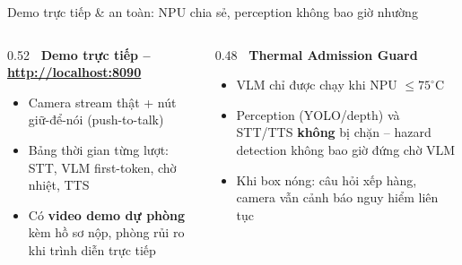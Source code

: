 \documentclass[aspectratio=169]{beamer}
\begin{document}
\begin{frame}{Demo trực tiếp \& an toàn: NPU chia sẻ, perception không bao giờ nhường}
  \begin{columns}[T]
    \begin{column}{0.52\textwidth}
      \textbf{\faPlayCircle\ Demo trực tiếp -- \url{http://localhost:8090}}
      \begin{itemize}
        \item Camera stream thật + nút giữ-để-nói (push-to-talk)
        \item Bảng thời gian từng lượt: STT, VLM first-token, chờ nhiệt, TTS
        \item Có \textbf{video demo dự phòng} kèm hồ sơ nộp, phòng rủi ro khi
              trình diễn trực tiếp
      \end{itemize}
    \end{column}
    \begin{column}{0.48\textwidth}
      \textbf{\faThermometerHalf\ Thermal Admission Guard}
      \begin{itemize}
        \item VLM chỉ được chạy khi NPU $\le 75^\circ$C
        \item Perception (YOLO/depth) và STT/TTS \textbf{không} bị chặn --
              hazard detection không bao giờ đứng chờ VLM
        \item Khi box nóng: câu hỏi xếp hàng, camera vẫn cảnh báo nguy hiểm
              liên tục
      \end{itemize}
    \end{column}
  \end{columns}
\end{frame}
\end{document}
